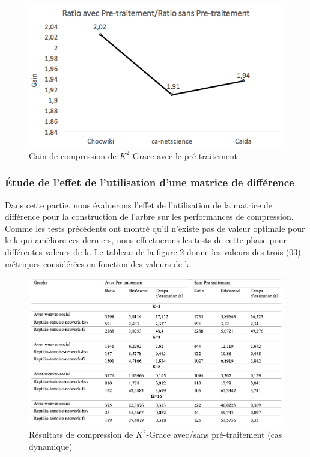\begin{figure}[H]
	\centering
	\includegraphics[scale=0.5]{ressources/image/gain.png}
	
	\caption{Gain de compression de $K^2$-Grace avec le pré-traitement}
	\label{fig:gain }
\end{figure}


\subsubsection{Étude de l'effet de l'utilisation d'une matrice de différence}

Dans cette partie, nous évaluerons l'effet de l'utilisation de la matrice de différence pour la construction de l'arbre sur les performances de compression. Comme les tests précédents ont montré  qu'il n'existe pas de valeur optimale pour le k qui améliore ces derniers, nous effectuerons les tests de cette phase pour différentes valeurs de k. Le tableau de la figure \ref{res-dyn-tst} donne les valeurs des trois (03) métriques considérées en fonction des valeurs de k.


\begin{figure}[H]
	\centering
	\includegraphics[scale=0.48]{ressources/image/ik2.png}
	\caption{Résultats de compression de $K^2$-Grace avec/sans pré-traitement (cas dynamique)}
	\label{res-dyn-tst}
\end{figure}

